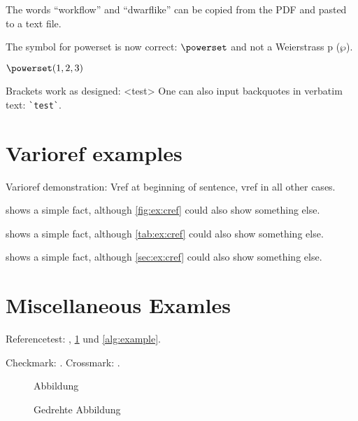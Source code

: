 \documentclass[
  fontsize=10pt
  numbers=noenddot,
  english,  %
  paper=a5,
  twoside,  %
  DIV=calc,
  headings=small,
  bibliography=totoc,
  listof=totoc,
  draft=false
]{scrbook}
\theoremstyle{break}
\newcommand{\dingcheck}{\ding{51}}
\newcommand{\dingcross}{\ding{55}}
\begin{document}
\begin{ltgexample}
The words \enquote{workflow} and \enquote{dwarflike} can be copied from the PDF and pasted to a text file.
\end{ltgexample}

\begin{ltgexample}
The symbol for powerset is now correct: $\powerset$ and not a Weierstrass p ($\wp$).

$\powerset({1,2,3})$
\end{ltgexample}

\begin{ltgexample}
Brackets work as designed:
<test>
One can also input backquotes in verbatim text: \verb|`test`|.
\end{ltgexample}


\section{Varioref examples}
\label{sec:ex:vref}

Varioref demonstration: Vref at beginning of sentence, vref in all other cases.

\begin{ltgexample}
 shows a simple fact, although \vref{fig:ex:cref} could also show something else.

 shows a simple fact, although \vref{tab:ex:cref} could also show something else.

 shows a simple fact, although \vref{sec:ex:cref} could also show something else.
\end{ltgexample}
\section{Miscellaneous Examles}
\label{ssec:example}

Referencetest: , \cref{fig:Abbildung} und \cref{alg:example}.

\begin{ltgexample}
Checkmark: \dingcheck. Crossmark: \dingcross.
\end{ltgexample}

\begin{figure}
  \missingfigure{}
  \caption{Abbildung}
  \label{fig:Abbildung}
\end{figure}

\begin{landscape}
  \begin{figure}
    \missingfigure{}
    \caption{Gedrehte Abbildung}
    \label{fig:AbbildungGedreht}
  \end{figure}
\end{landscape}
\end{document}

